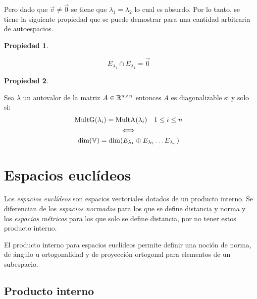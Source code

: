 \documentclass[a5paper,12pt,twoside]{book}
\newtheorem{prop}{{Propiedad}}[chapter]
\begin{document}
Pero dado que $\Vec{v}\neq\Vec{0}$ se tiene que $\lambda_1=\lambda_2$ lo cual es absurdo.
Por lo tanto, se tiene la siguiente propiedad que se puede demostrar para una cantidad arbitraria de autoespacios.

\begin{mdframed}[style=PropertyFrame]
    \begin{prop}
    \end{prop}
    \begin{equation*}
        E_{\lambda_1} \cap E_{\lambda_1} = \Vec{0}
    \end{equation*}
\end{mdframed}

\begin{mdframed}[style=PropertyFrame]
    \begin{prop}
    \end{prop}
    Sea $\lambda$ un autovalor de la matriz $A\in\mathbb{R}^{n\times n}$ entonces $A$ es diagonalizable si y solo si:
    \begin{gather*}
        \operatorname{MultG} (\lambda_i) = \operatorname{MultA} (\lambda_i) \quad 1\leq i\leq n
        \\
        \iff
        \\
        \operatorname{dim}(\mathbb{V}) = \operatorname{dim}(E_{\lambda_1} \oplus E_{\lambda_2} \dots E_{\lambda_n})
    \end{gather*}
\end{mdframed}


\chapter{Espacios euclídeos}

Los \emph{espacios euclídeos} son espacios vectoriales dotados de un producto interno.
Se diferencian de los \emph{espacios normados} para los que se define distancia y norma y los \emph{espacios métricos} para los que solo se define distancia, por no tener estos producto interno.

El producto interno para espacios euclídeos permite definir una noción de norma, de ángulo u ortogonalidad y de proyección ortogonal para elementos de un subespacio.


\section{Producto interno}
\end{document}

